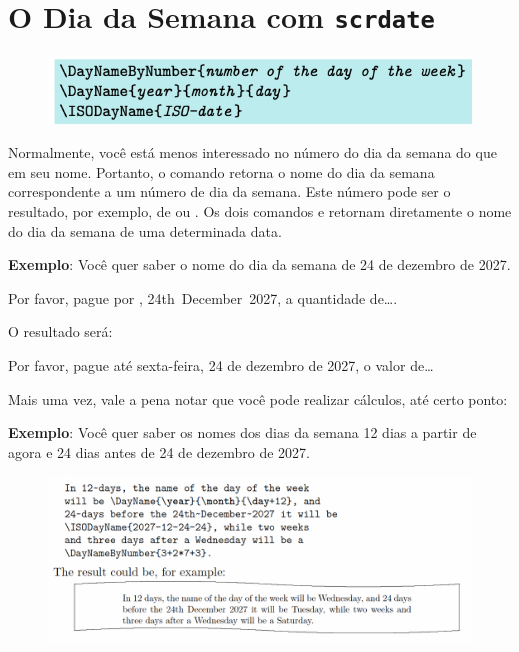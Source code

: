 \chapter{O Dia da Semana com \texttt{scrdate}}
\begin{figure}[h]
    \centering
    \includegraphics[width=0.75\linewidth]{imagens/imagem10.png}
\end{figure}

Normalmente, você está menos interessado no número do dia da semana do que em seu nome. Portanto, o comando  retorna o nome do dia da semana correspondente a um número de dia da semana. Este número pode ser o resultado, por exemplo, de  ou . Os dois comandos  e  retornam diretamente o nome do dia da semana de uma determinada data.

\bigskip
\textbf{Exemplo}: Você quer saber o nome do dia da semana de 24 de dezembro de 2027.

Por favor, pague por , 24th~December~2027, a quantidade de\dots.  
\medskip

O resultado será:

Por favor, pague até sexta-feira, 24 de dezembro de 2027, o valor de\ldots

\medskip
Mais uma vez, vale a pena notar que você pode realizar cálculos, até certo ponto:

\bigskip
\textbf{Exemplo}: Você quer saber os nomes dos dias da semana 12 dias a partir de agora e 24 dias antes de 24 de dezembro de 2027.

\begin{figure}[h]
    \centering
    \includegraphics[width=0.9\linewidth]{imagens/imagem11.png}
\end{figure}

